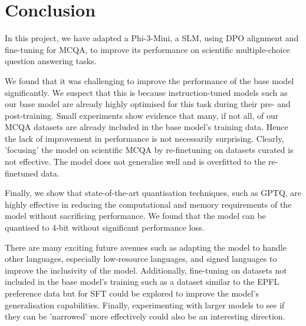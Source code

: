\section{Conclusion}
\label{sec:conclusion}


In this project, we have adapted a Phi-3-Mini, a SLM, using DPO alignment and
fine-tuning for MCQA, to improve its performance on scientific multiple-choice
question answering tasks. 

We found that it was challenging to improve the performance of the base model
significantly. We suspect that this is because instruction-tuned models such as
our base model are already highly optimised for this task during their pre- and
post-training. Small experiments show evidence that many, if not all, of our
MCQA datasets are already included in the base model's training data. Hence the
lack of improvement in performance is not necessarily surprising. Clearly,
'focusing' the model on scientific MCQA by re-finetuning on datasets curated is
not effective. The model does not generalise well and is overfitted to the
re-finetuned data.

Finally, we show that state-of-the-art quantisation techniques, such as GPTQ,
are highly effective in reducing the computational and memory requirements of
the model without sacrificing performance. We found that the model can be
quantised to 4-bit without significant performance loss.


There are many exciting future avenues such as adapting the model to handle
other languages, especially low-resource languages, and signed languages to
improve the inclusivity of the model. Additionally, fine-tuning on datasets not
included in the base model's training such as a dataset similar to the EPFL
preference data but for SFT could be explored to improve the model's
generalisation capabilities. Finally, experimenting with larger models to see if
they can be 'narrowed' more effectively could also be an interesting direction.